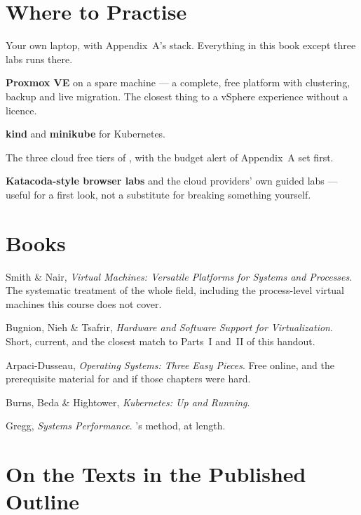 \section{Where to Practise}

\begin{tight}
  \item Your own laptop, with Appendix~A's stack. Everything in this book
        except three labs runs there.
  \item \textbf{Proxmox VE} on a spare machine --- a complete, free platform
        with clustering, backup and live migration. The closest thing to a
        vSphere experience without a licence.
  \item \textbf{kind} and \textbf{minikube} for Kubernetes.
  \item The three cloud free tiers of , with the budget alert of
        Appendix~A set first.
  \item \textbf{Katacoda-style browser labs} and the cloud providers' own
        guided labs --- useful for a first look, not a substitute for breaking
        something yourself.
\end{tight}

\section{Books}

\begin{tight}
  \item Smith \& Nair, \emph{Virtual Machines: Versatile Platforms for Systems
        and Processes}. The systematic treatment of the whole field, including
        the process-level virtual machines this course does not cover.
  \item Bugnion, Nieh \& Tsafrir, \emph{Hardware and Software Support for
        Virtualization}. Short, current, and the closest match to Parts~I
        and~II of this handout.
  \item Arpaci-Dusseau, \emph{Operating Systems: Three Easy Pieces}. Free
        online, and the prerequisite material for  and
         if those chapters were hard.
  \item Burns, Beda \& Hightower, \emph{Kubernetes: Up and Running}.
  \item Gregg, \emph{Systems Performance}. 's method, at
        length.
\end{tight}

\section{On the Texts in the Published Outline}

